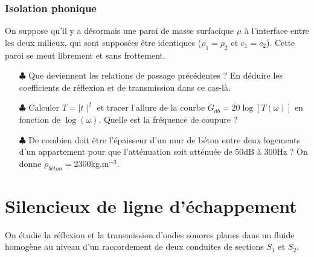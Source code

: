 \documentclass{report}
\begin{document}
\subsubsection*{Isolation phonique}

On suppose qu'il y a désormais une paroi de masse surfacique $\mu$ à l'interface entre les deux milieux, qui sont supposées être identiques ($\rho_1=\rho_2$ et $c_1=c_2$). Cette paroi se meut librement et sans frottement. 

\begin{itemize}
	
	\item[$\clubsuit$] Que deviennent les relations de passage précédentes ? En déduire les coefficients de réflexion et de transmission dans ce cas-là. 
	
	\item[$\clubsuit$] Calculer $T=\mid t\mid^2$ et tracer l'allure de la courbe $G_{db}=20\log\left[T(\omega) \right]$ en fonction de $\log(\omega)$. Quelle est la fréquence de coupure ?
	
	\item[$\clubsuit$] De combien doit être l'épaisseur d'un mur de béton entre deux logements d'un appartement pour que l'atténuation soit atténuée de 50dB à 300Hz ? On donne $\rho_{béton}=2300$kg.m$^{-3}$. 
	
\end{itemize}

\newpage

\section*{Silencieux de ligne d'échappement}

On étudie la réflexion et la transmission d'ondes sonores planes dans un fluide homogène au niveau d'un raccordement  de deux conduites de sections $S_1$ et $S_2$. 
\end{document}
